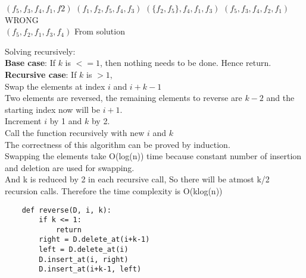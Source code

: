 \documentclass[12pt,twoside]{article}
\begin{document}


\begin{problems}

\problem  %

\begin{problemparts}
\problempart %
$(f_5, f_3, f_4, f_1, f2)$
\problempart %
$(f_1, f_2, f_5, f_4, f_3)$
\problempart %
$(\{f_2, f_5\}, f_4, f_1, f_3)$
\problempart %
$(f_5, f_3, f_4, f_2, f_1)$ \quad WRONG \\
$(f_5, f_2, f_1, f_3, f_4)$ \quad From solution
\end{problemparts}

\newpage
\problem  %

\begin{problemparts}
\problempart %
Solving recursively: \\
\textbf{Base case}: If $k$ is $<= 1$, then nothing needs to be done. Hence return.\\
\textbf{Recursive case}: If $k$ is $>1$,\\
Swap the elements at index $i$ and $i+k-1$ \\
Two elements are reversed, the remaining elements to reverse are $k-2$ and the starting index now will be $i+1$. \\
Increment $i$ by 1 and $k$ by 2. \\
Call the function recursively with new $i$ and $k$ \\
The correctness of this algorithm can be proved by induction. \\
Swapping the elements take O(log(n)) time because constant number of insertion and deletion are used for swapping. \\
And k is reduced by 2 in each recursive call, So there will be atmost k/2 recursion calls. Therefore the time complexity is O(klog(n))

\begin{lstlisting}
    def reverse(D, i, k):
        if k <= 1:
            return
        right = D.delete_at(i+k-1)
        left = D.delete_at(i)
        D.insert_at(i, right)
        D.insert_at(i+k-1, left)
        

\end{lstlisting}
\end{problemparts}
\end{problems}
\end{document}

